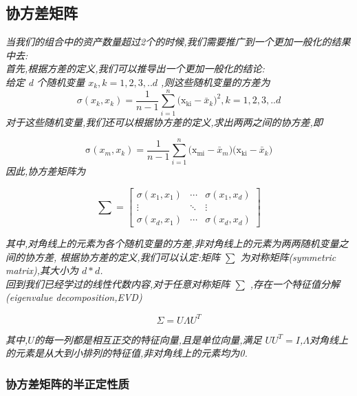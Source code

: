 \documentclass{scrartcl}
\numberwithin{equation}{section}
\begin{document}
\subsection{协方差矩阵}

\textsl{当我们的组合中的资产数量超过2个的时候,我们需要推广到一个更加一般化的结果中去:
    \\首先,根据方差的定义,我们可以推导出一个更加一般化的结论:\\给定 d 个随机变量 $\mathit{x_k,k=1,2,3,..d}$ ,则这些随机变量的方差为}
\begin{equation}
    \sigma(x_k,x_k) =\frac{1}{n - 1} \sum^n_{i=1} {(\mathrm{x_{ki}}  - \bar{x}_k})^2,k=1,2,3,..d
\end{equation}
\textsl{对于这些随机变量,我们还可以根据协方差的定义,求出两两之间的协方差,即}

\begin{equation}
    \mathrm{\sigma}(x_m,x_k)=  \frac{1}{n - 1} \sum^n_{i=1} {(\mathrm{x_{mi}}  - \bar{x}_m}) {(\mathrm{x_{ki}}  - \bar{x}_k})
\end{equation}
\textsl{因此,协方差矩阵为}

\begin{equation}
    \sum =\left[ \begin{array}{ccc}
            \sigma(x_1,x_1) & \cdots & \sigma(x_1,x_d) \\
            \vdots          & \ddots & \vdots          \\
            \sigma(x_d,x_1) & \cdots & \sigma(x_d,x_d)
        \end{array}
        \right ]
\end{equation}

\textsl{其中,对角线上的元素为各个随机变量的方差,非对角线上的元素为两两随机变量之间的协方差,
    根据协方差的定义,我们可以认定:矩阵 $ \sum $ 为对称矩阵(symmetric matrix),其大小为 $d*d$.
    \\回到我们已经学过的线性代数内容,对于任意对称矩阵 $ \sum $ ,存在一个特征值分解(eigenvalue decomposition,EVD)}

\begin{equation}
    \Sigma = U\Lambda U^T
\end{equation}

\textsl{其中,$U$的每一列都是相互正交的特征向量,且是单位向量,满足 $UU^T=I$,$\Lambda$对角线上的元素是从大到小排列的特征值,非对角线上的元素均为0.
}
\subsubsection{协方差矩阵的半正定性质}
\end{document}
